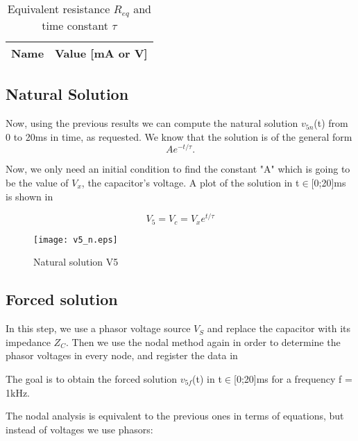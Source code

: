 \begin{table}[h]
  \centering
  \begin{tabular}{|l|r|}
    \hline    
    {\bf Name} & {\bf Value [mA or V]} \\ \hline
    
  \end{tabular}
  \caption{Equivalent resistance $R_{eq}$ and time constant $\tau$}
  \label{tab:Req}
\end{table}
\FloatBarrier

\subsection{Natural Solution}

Now, using the previous results we can compute the natural solution $v_{5n}$(t) from 0 to 20ms in time, as requested. We know that the solution is of the general form 
\begin{equation}
Ae^{-t/\tau}.
\label{eq:kvl11}
\end{equation}

Now, we only need an initial condition to find the constant "A" which is going to be the value of $V_x$, the capacitor's voltage. A plot of the solution in t$\in$[0;20]ms is shown in %


\begin{equation}
  V_5 = V_c = V_xe^{t/\tau} 
  \label{eq:kvl12}
\end{equation}


\begin{figure}[h] \centering
\texttt{[image: v5\_n.eps]}
\caption{Natural solution V5}
\label{fig:v5_n}
\end{figure}
\FloatBarrier

\subsection{Forced solution}

In this step, we use a phasor voltage source $V_S$ and replace the capacitor with its impedance $Z_C$. Then we use the nodal method again in order to determine the phasor voltages in every node, and register the data in %
\par
The goal is to obtain the forced solution $v_{5f}$(t) in t$\in$[0;20]ms for a frequency f = 1kHz. \par
The nodal analysis is equivalent to the previous ones in terms of equations, but instead of voltages we use phasors:

